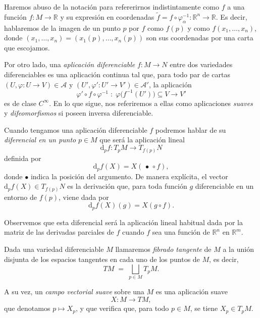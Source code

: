 Haremos abuso de la notación para refererirnos indistintamente como $f$ a una función $f:M\to \mathbb{R}$ y su expresión en coordenadas $\tilde{f} = f\circ\varphi_{\alpha}^{-1} : \mathbb{R}^n \to \mathbb{R}$. Es decir, hablaremos de la imagen de un punto $p$ por $f$ como $f(p)$ y como $f(x_1,\dots,x_n)$, donde $(x_1,\dots,x_n)=(x_1(p),\dots,x_n(p))$ son sus coordenadas por una carta que escojamos. 

\bigskip

Por otro lado, una \textit{aplicación diferenciable} $f \colon M \to N$ entre dos variedades diferenciables es una aplicación continua tal que, para todo par de cartas
$(U,\varphi \colon U \to V) \in \mathcal A$ y $(U',\varphi' \colon U' \to V') \in \mathcal A'$, la aplicación
\[
\varphi' \circ f \circ \varphi^{-1}
\;:\;
\varphi\bigl(f^{-1}(U')\bigr) \subseteq V
\longrightarrow V'
\]
es de clase $C^\infty$. En lo que sigue, nos referiremos a ellas como aplicaciones \textit{suaves} y \textit{difeomorfismos} si poseen inversa diferenciable.

\bigskip

Cuando tengamos una aplicación diferenciable $f$ podremos hablar de su \textit{diferencial en un punto} $p \in M$ que será la aplicación lineal
\[
\mathrm d_p f \colon T_p M \longrightarrow T_{f(p)} N
\]
definida por
\[
\mathrm d_p f(X) = X(\,\bullet\, \circ f),
\]
donde $\bullet$ indica la posición del argumento. De manera explícita, el vector $\mathrm d_p f(X) \in T_{f(p)}N$ es la derivación  que, para toda función $g$ diferenciable en un entorno de $f(p)$, viene dada por
\[
\mathrm d_p f(X)(g) = X(g \circ f).
\]

Observemos que esta diferencial será la aplicación lineal habitual dada por la matriz de las derivadas parciales de $f$ cuando $f$ sea una función de $\mathbb{R}^n$ en $\mathbb{R}^m$.

\bigskip

Dada una variedad diferenciable $M$ llamaremos \textit{fibrado tangente} de $M$ a la unión disjunta
de los espacios tangentes en cada uno de los puntos de $M$, es decir,
\[
TM \;=\; \bigsqcup_{p \in M} T_pM.
\]

A su vez, un \textit{campo vectorial suave} sobre una $M$ es una aplicación suave
\[
X \colon M \to TM,
\]
que denotamos $p \mapsto X_p$, y que verifica que, para todo $p \in M$, se tiene $X_p \in T_pM$.

\bigskip

